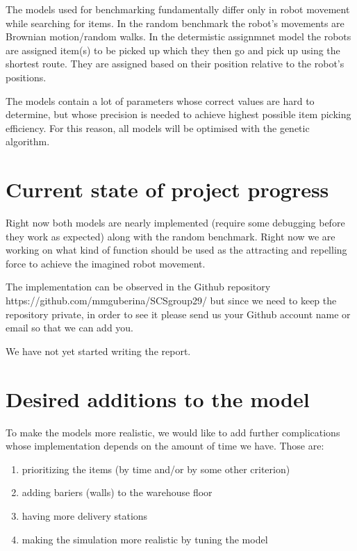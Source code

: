 \documentclass{article}
\begin{document}
The models used for benchmarking fundamentally differ only in robot movement
while searching for items. In the random benchmark the robot's movements
are Brownian motion/random walks. In the determistic assignmnet model
the robots are assigned item(s) to be picked up which they then go and pick up
using the shortest route. They are assigned based on their 
position relative to the robot's positions.

The models contain a lot of parameters whose correct values are hard to determine,
but whose precision is needed to achieve highest possible item picking efficiency.
For this reason, all models will be optimised with the genetic algorithm.

\section{Current state of project progress}
Right now both models are nearly implemented (require some debugging before
they work as expected) along with the random benchmark. 
Right now we are working on what kind of function should be used
as the attracting and repelling force to achieve the imagined robot movement.

The implementation can be observed in the Github repository 
\newline
https://github.com/mmguberina/SCSgroup29/
\newline
but since we need to keep the repository private, in order to see it please 
send us your Github account name or email so that we can add you.

We have not yet started writing the report.

\section{Desired additions to the model}
To make the models more realistic, we would like to add further complications
whose implementation depends on the amount of time we have.
Those are:

\begin{enumerate}
		\item prioritizing the items (by time and/or by some other criterion)
		\item adding bariers (walls) to the warehouse floor
		\item having more delivery stations
		\item making the simulation more realistic by tuning the model
\end{enumerate}
\end{document}
